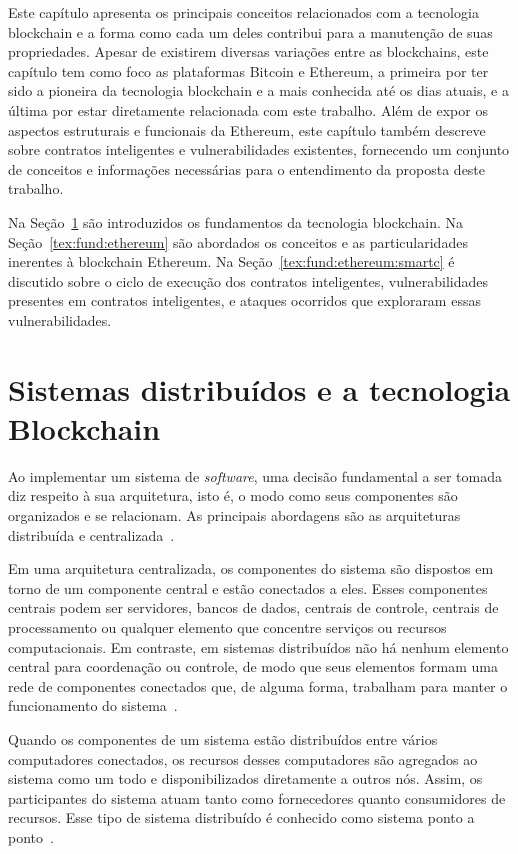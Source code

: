 Este capítulo apresenta os principais conceitos relacionados com a tecnologia blockchain e a forma como cada um deles contribui para a manutenção de suas propriedades. Apesar de existirem diversas variações entre as blockchains, este capítulo tem como foco as plataformas Bitcoin e Ethereum, a primeira por ter sido a pioneira da tecnologia blockchain e a mais conhecida até os dias atuais, e a última por estar diretamente relacionada com este trabalho. Além de expor os aspectos estruturais e funcionais da Ethereum, este capítulo também descreve sobre contratos inteligentes e vulnerabilidades existentes, fornecendo um conjunto de conceitos e informações necessárias para o entendimento da proposta deste trabalho.

Na Seção~\ref{tex:fund:blockchain} são introduzidos os fundamentos da tecnologia blockchain. Na Seção~\ref{tex:fund:ethereum} são abordados os conceitos e as particularidades inerentes à blockchain Ethereum. Na Seção~\ref{tex:fund:ethereum:smartc} é discutido sobre o ciclo de execução dos contratos inteligentes, vulnerabilidades presentes em contratos inteligentes, e ataques ocorridos que exploraram essas vulnerabilidades.

\section{Sistemas distribuídos e a tecnologia Blockchain} \label{tex:fund:blockchain}

Ao implementar um sistema de \textit{software}, uma decisão fundamental a ser tomada diz respeito à sua arquitetura, isto é, o modo como seus componentes são organizados e se relacionam. As principais abordagens são as arquiteturas distribuída e centralizada~\cite{tanembaum2007sistemas}.

Em uma arquitetura centralizada, os componentes do sistema são dispostos em torno de um componente central e estão conectados a eles. Esses componentes centrais podem ser servidores, bancos de dados, centrais de controle, centrais de processamento ou qualquer elemento que concentre serviços ou recursos computacionais. Em contraste, em sistemas distribuídos não há nenhum elemento central para coordenação ou controle, de modo que seus elementos formam uma rede de componentes conectados que, de alguma forma, trabalham para manter o funcionamento do sistema~\cite{tanembaum2007sistemas}.

Quando os componentes de um sistema estão distribuídos entre vários computadores conectados, os recursos desses computadores são agregados ao sistema como um todo e disponibilizados diretamente a outros nós. Assim, os participantes do sistema atuam tanto como fornecedores quanto consumidores de recursos. Esse tipo de sistema distribuído é conhecido como sistema ponto a ponto~\cite{tanembaum2007sistemas}.


